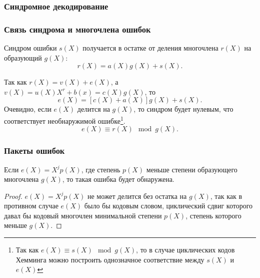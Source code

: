 \begin{frame}
    \frametitle{Синдромное декодирование}
    \frametitle{Связь синдрома и многочлена ошибок}
    
    \alert{Синдром} ошибки $s(X)$ получается в остатке от деления многочлена $r(X)$ на образующий $g(X)$:
    \[r(X)=a(X)g(X)+s(X).\]
    
    Так как $r(X)=v(X)+e(X)$, а $v(X)=u(X)X^r+b(x)=c(X)g(X)$, то 
    \[
        e(X)=[c(X)+a(X)]g(X)+s(X).
    \]
    Очевидно, если $e(X)$ делится на $g(X)$, то синдром будет нулевым, что соответствует \alert{необнаружимой} ошибке\footnote{Так как $e(X)\equiv s(X)\mod g(X)$, то в случае циклических кодов Хемминга можно построить однозначное соответствие между $s(X)$ и $e(X)$}.
    \[
        e(X)\equiv r(X)\mod g(X). 
    \]    
\end{frame}


\begin{frame}
    \frametitle{Пакеты ошибок}
    
    \begin{theorem}
        Если $e(X)=X^jp(X)$, где степень $p(X)$ меньше степени образующего многочлена $g(X)$, то такая ошибка будет обнаружена. 
    \end{theorem}
    
    \begin{proof}
        $e(X)=X^jp(X)$ не может делится без остатка на $g(X)$, так как в противном случае $e(X)$ было бы кодовым словом, циклический сдвиг которого давал бы кодовый многочлен минимальной степени $p(X)$, степень которого меньше $g(X)$.
    \end{proof}
\end{frame}


